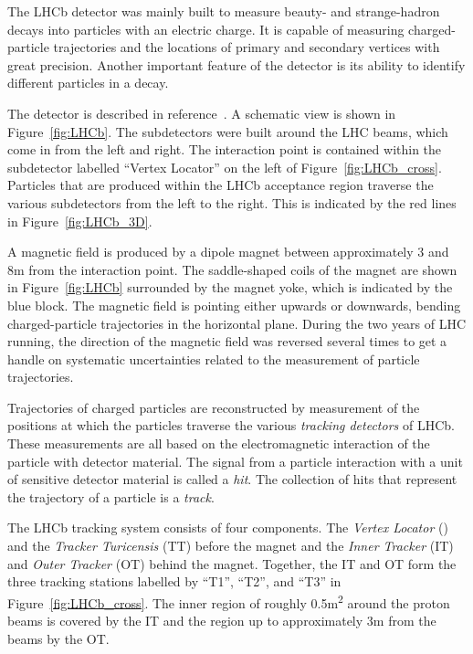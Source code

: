 The LHCb detector was mainly built to measure beauty- and strange-hadron decays into particles with an electric charge. It is capable of
measuring charged-particle trajectories and the locations of primary and secondary vertices with great precision. Another important feature
of the detector is its ability to identify different particles in a decay.

The detector is described in reference~\cite{Alves:2008zz}. A schematic view is shown in Figure~\ref{fig:LHCb}. The subdetectors were built
around the LHC beams, which come in from the left and right. The interaction point is contained within the subdetector labelled ``Vertex
Locator'' on the left of Figure~\ref{fig:LHCb_cross}. Particles that are produced within the LHCb acceptance region traverse the various
subdetectors from the left to the right. This is indicated by the red lines in Figure~\ref{fig:LHCb_3D}.

A magnetic field is produced by a dipole magnet between approximately 3 and 8\unitsp{}m from the interaction point. The saddle-shaped coils
of the magnet are shown in Figure~\ref{fig:LHCb} surrounded by the magnet yoke, which is indicated by the blue block. The magnetic field is
pointing either upwards or downwards, bending charged-particle trajectories in the horizontal plane. During the two years of LHC running,
the direction of the magnetic field was reversed several times to get a handle on systematic uncertainties related to the measurement of
particle trajectories.

Trajectories of charged particles are reconstructed by measurement of the positions at which the particles traverse the various
\emph{tracking detectors} of LHCb. These measurements are all based on the electromagnetic interaction of the particle with detector
material. The signal from a particle interaction with a unit of sensitive detector material is called a \emph{hit}. The collection of hits
that represent the trajectory of a particle is a \emph{track}.

The LHCb tracking system consists of four components. The \emph{Vertex Locator} (\velo) and the \emph{Tracker Turicensis} (TT)
before the magnet and the \emph{Inner Tracker} (IT) and \emph{Outer Tracker} (OT) behind the magnet. Together, the IT and OT form the
three tracking stations labelled by ``T1'', ``T2'', and ``T3'' in Figure~\ref{fig:LHCb_cross}. The inner region of roughly
0.5\unitsp{}m\textsuperscript{2} around the proton beams is covered by the IT and the region up to approximately 3\unitsp{}m from the beams
by the OT.

